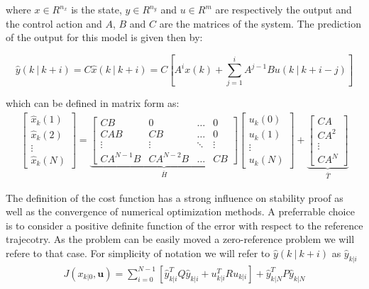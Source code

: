 where $x \in R^{n_x}$ is the state, $y \in R^{n_y}$ and $u \in R^m$ are respectively the output and the control action and $A$, $B$ and $C$ are the matrices of the system. The prediction of the output for this model is given then by:

\begin{equation}
	\hat{y}(k\ |\ k+i)=C\hat{x}(k\ |\ k+i)=C\left[A^i x(k) + \sum_{j=1}^{i} A^{j-1}Bu(k\ |\ k+i-j)\right]
\end{equation}
\label{system_prediction}

which can be defined in matrix form as: 
\begin{equation}
\begin{split}
	\left[ \begin{matrix} \hat{x}_k(1) \\ \hat{x}_k(2) \\ \vdots \\ \hat{x}_k(N) \end{matrix} \right] = \underbrace{\left[ \begin{matrix}
	CB		 & 	0	    &	\dots	&	0 		\\
	CAB		 & 	CB	    &	\dots	&	0 		\\
	\vdots	 &  \vdots  &	\ddots	&	\vdots	\\
	CA^{N-1}B & CA^{N-2}B &   \dots   &	CB			
	\end{matrix}\right]}_{\bar{H}}\left[ \begin{matrix} u_k(0) \\ u_k(1) \\ \vdots \\ u_k(N) \end{matrix} \right]+ \underbrace{\left[ \begin{matrix} CA \\ CA^2 \\ \vdots \\ CA^N \end{matrix} \right]}_{\bar{T}}
	\end{split}	
\end{equation}

The definition of the cost function has a strong influence on stability proof as well as the convergence of numerical optimization methods. A preferrable choice is to consider a positive definite function of the error with respect to the reference trajecotry. As the problem can be easily moved a zero-reference problem we will refere to that case. For simplicity of notation we will refer to $\hat{y}(k\ |\ k+i)$ as $\hat{y}_{k|i}$
\begin{equation}
	\begin{split}
		J(x_{k|0},\textbf{u}) = \sum_{i=0}^{N-1} \left[\hat{y}_{k|i}^T Q \hat{y}_{k|i} + u_{k|i}^TRu_{k|i} \right] + \hat{y}_{k|N}^T P \hat{y}_{k|N}
	\end{split}	
\end{equation}

